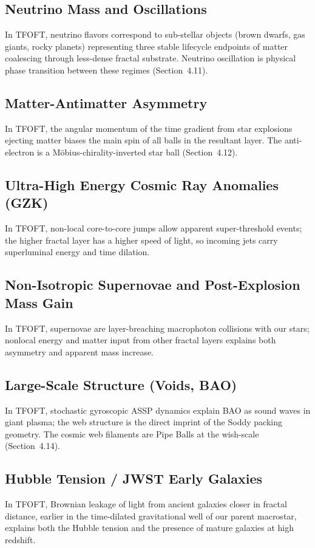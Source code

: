 \documentclass[11pt,a4paper]{article}
\begin{document}
\subsection{Neutrino Mass and Oscillations}
In TFOFT, neutrino flavors correspond to sub-stellar objects (brown dwarfs, gas
giants, rocky planets) representing three stable lifecycle endpoints of matter
coalescing through less-dense fractal substrate. Neutrino oscillation is physical
phase transition between these regimes (Section~4.11).

\subsection{Matter-Antimatter Asymmetry}
In TFOFT, the angular momentum of the time gradient from star explosions ejecting
matter biases the main spin of all balls in the resultant layer. The anti-electron
is a M\"obius-chirality-inverted star ball (Section~4.12).

\subsection{Ultra-High Energy Cosmic Ray Anomalies (GZK)}
In TFOFT, non-local core-to-core jumps allow apparent super-threshold events; the
higher fractal layer has a higher speed of light, so incoming jets carry
superluminal energy and time dilation.

\subsection{Non-Isotropic Supernovae and Post-Explosion Mass Gain}
In TFOFT, supernovae are layer-breaching macrophoton collisions with our stars; nonlocal energy and matter input from other fractal layers explains both asymmetry and apparent mass increase.

\subsection{Large-Scale Structure (Voids, BAO)}
In TFOFT, stochastic gyroscopic ASSP dynamics explain BAO as sound waves in giant
plasma; the web structure is the direct imprint of the Soddy packing geometry. The
cosmic web filaments are Pipe Balls at the wish-scale (Section~4.14).

\subsection{Hubble Tension / JWST Early Galaxies}
In TFOFT, Brownian leakage of light from ancient galaxies closer in fractal
distance, earlier in the time-dilated gravitational well of our parent macrostar,
explains both the Hubble tension and the presence of mature galaxies at high
redshift.
\end{document}
